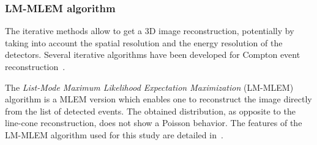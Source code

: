 \subsubsection{LM-MLEM algorithm}	
The iterative methods allow to get a 3D image reconstruction, potentially by taking into account the spatial resolution and the energy resolution of the detectors. Several iterative algorithms have been developed for Compton event reconstruction~\cite{schone_common_2010, zoglauer_design_2011,gillam_compton_2011,mackin_evaluation_2012,lojacono_low_2013, Huang2018, Taya2017, Schoene2017}.

The \textit{List-Mode Maximum Likelihood Expectation Maximization} (LM-MLEM) algorithm is a MLEM version which enables one to reconstruct the image directly from the list of detected events. The obtained distribution, as opposite to the line-cone reconstruction, does not show a Poisson behavior. 
The features of the LM-MLEM algorithm used for this study are detailed in~\cite{hilaire_compton_2014}. 

